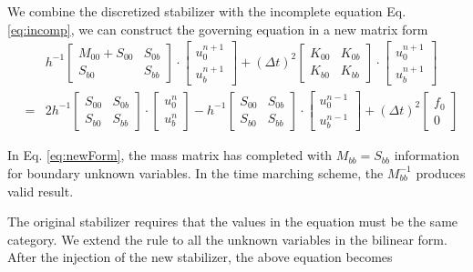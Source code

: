 We combine the discretized stabilizer with the incomplete equation Eq. \eqref{eq:incomp}, we can construct the governing equation in a new matrix form
\begin{eqnarray} \label{eq:newForm}
&& h^{-1}\begin{bmatrix}
M_{00} + S_{00} & S_{0b} \\ S_{b0} & S_{bb}
\end{bmatrix} \cdot \begin{bmatrix}
u_{0}^{n + 1} \\ u_{b}^{n + 1}
\end{bmatrix} + (\Delta t)^{2} 
\begin{bmatrix}
K_{00} & K_{0b} \\ K_{b0} & K_{bb}
\end{bmatrix} \cdot \begin{bmatrix}
u_{0}^{n + 1} \\ u_{b}^{n + 1}
\end{bmatrix}\\
& =& 2 h^{-1} \begin{bmatrix}
S_{00} & S_{0b} \\ S_{b0} & S_{bb}
\end{bmatrix} \cdot
\begin{bmatrix}
u_{0}^{n} \\ u_{b}^{n}
\end{bmatrix} - h^{-1}\begin{bmatrix}
S_{00} & S_{0b} \\ S_{b0} & S_{bb}
\end{bmatrix} \cdot
\begin{bmatrix}
u_{0}^{n - 1} \\ u_{b}^{n - 1}
\end{bmatrix} + (\Delta t)^{2} \begin{bmatrix}
f_{0} \\ 0
\end{bmatrix}
\end{eqnarray}

In Eq. \eqref{eq:newForm}, the mass matrix has completed with $ M_{bb} = S_{bb} $ information for boundary unknown variables. In the time marching scheme, the $ M_{bb}^{-1} $ produces valid result.

The original stabilizer requires that the values in the equation must be the same category. We extend the rule to all the unknown variables in the bilinear form. After the injection of the new stabilizer, the above equation becomes

